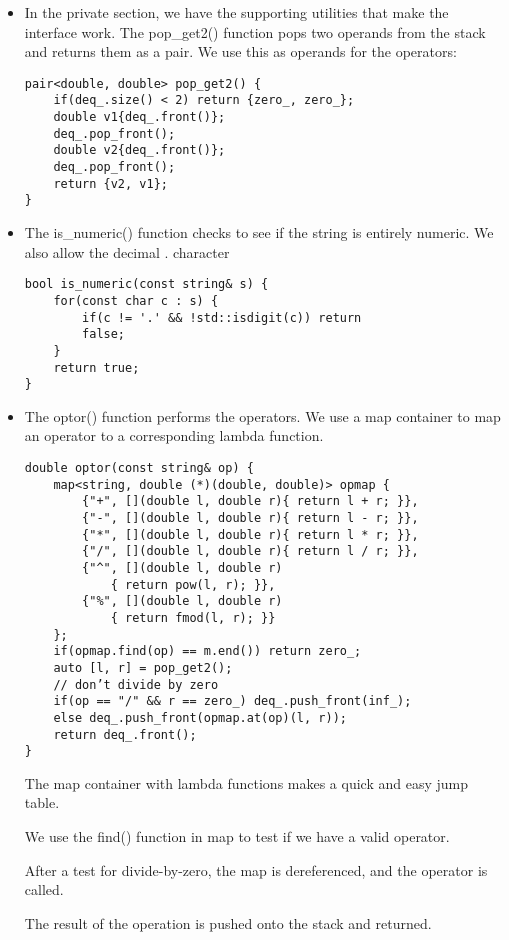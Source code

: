 \begin{itemize}
\item 
In the private section, we have the supporting utilities that make the interface work. The pop\_get2() function pops two operands from the stack and returns them as a pair. We use this as operands for the operators:

\begin{lstlisting}[style=styleCXX]
pair<double, double> pop_get2() {
	if(deq_.size() < 2) return {zero_, zero_};
	double v1{deq_.front()};
	deq_.pop_front();
	double v2{deq_.front()};
	deq_.pop_front();
	return {v2, v1};
}
\end{lstlisting}

\item 
The is\_numeric() function checks to see if the string is entirely numeric. We also allow the decimal . character

\begin{lstlisting}[style=styleCXX]
bool is_numeric(const string& s) {
	for(const char c : s) {
		if(c != '.' && !std::isdigit(c)) return
		false;
	}
	return true;
}
\end{lstlisting}

\item 
The optor() function performs the operators. We use a map container to map an operator to a corresponding lambda function.

\begin{lstlisting}[style=styleCXX]
double optor(const string& op) {
	map<string, double (*)(double, double)> opmap {
		{"+", [](double l, double r){ return l + r; }},
		{"-", [](double l, double r){ return l - r; }},
		{"*", [](double l, double r){ return l * r; }},
		{"/", [](double l, double r){ return l / r; }},
		{"^", [](double l, double r)
			{ return pow(l, r); }},
		{"%", [](double l, double r)
			{ return fmod(l, r); }}
	};
	if(opmap.find(op) == m.end()) return zero_;
	auto [l, r] = pop_get2();
	// don’t divide by zero
	if(op == "/" && r == zero_) deq_.push_front(inf_);
	else deq_.push_front(opmap.at(op)(l, r));
	return deq_.front();
}
\end{lstlisting}

The map container with lambda functions makes a quick and easy jump table.

We use the find() function in map to test if we have a valid operator.

After a test for divide-by-zero, the map is dereferenced, and the operator is called.

The result of the operation is pushed onto the stack and returned.


\end{itemize}
